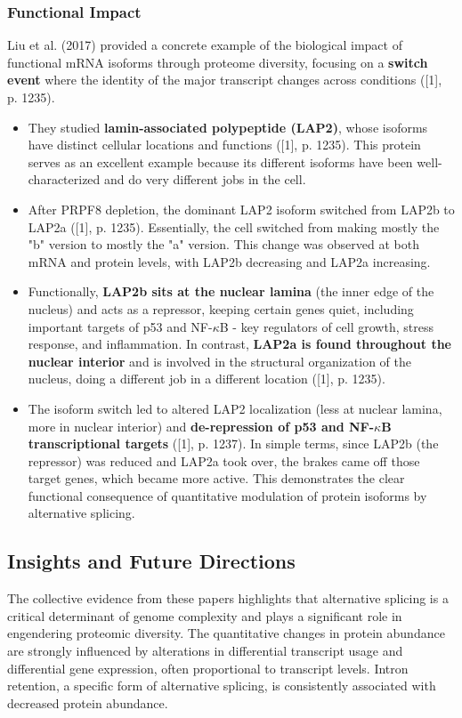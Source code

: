 \documentclass[12pt,a4paper]{article}
\begin{document}
\subsubsection{Functional Impact}

Liu et al. (2017) provided a concrete example of the biological impact of functional mRNA isoforms through proteome diversity, focusing on a \textbf{switch event} where the identity of the major transcript changes across conditions ([1], p. 1235).
\begin{itemize}
    \item They studied \textbf{lamin-associated polypeptide (LAP2)}, whose isoforms have distinct cellular locations and functions ([1], p. 1235). This protein serves as an excellent example because its different isoforms have been well-characterized and do very different jobs in the cell.
    \item After PRPF8 depletion, the dominant LAP2 isoform switched from LAP2b to LAP2a ([1], p. 1235). Essentially, the cell switched from making mostly the "b" version to mostly the "a" version. This change was observed at both mRNA and protein levels, with LAP2b decreasing and LAP2a increasing.
    \item Functionally, \textbf{LAP2b sits at the nuclear lamina} (the inner edge of the nucleus) and acts as a repressor, keeping certain genes quiet, including important targets of p53 and NF-$\kappa$B - key regulators of cell growth, stress response, and inflammation. In contrast, \textbf{LAP2a is found throughout the nuclear interior} and is involved in the structural organization of the nucleus, doing a different job in a different location ([1], p. 1235).
    \item The isoform switch led to altered LAP2 localization (less at nuclear lamina, more in nuclear interior) and \textbf{de-repression of p53 and NF-$\kappa$B transcriptional targets} ([1], p. 1237). In simple terms, since LAP2b (the repressor) was reduced and LAP2a took over, the brakes came off those target genes, which became more active. This demonstrates the clear functional consequence of quantitative modulation of protein isoforms by alternative splicing.
\end{itemize}

\subsection{Insights and Future Directions}

The collective evidence from these papers highlights that alternative splicing is a critical determinant of genome complexity and plays a significant role in engendering proteomic diversity. The quantitative changes in protein abundance are strongly influenced by alterations in differential transcript usage and differential gene expression, often proportional to transcript levels. Intron retention, a specific form of alternative splicing, is consistently associated with decreased protein abundance.
\end{document}
